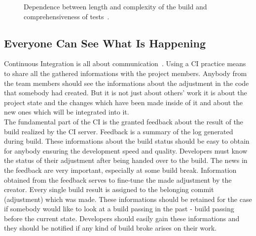 \begin{figure}[H]
    \centering
    \caption{Dependence between length and complexity of the build and comprehensiveness of tests~\cite{deployment_automation}.}
    \label{fig:grap_dependence}
\end{figure}

\subsection{Everyone Can See What Is Happening}

Continuous Integration is all about communication~\cite{MartinFowler}. Using a CI practice means to share all the gathered informations with the project members. Anybody from the team members should see the informations about the adjustment in the code that somebody had created. But it is not just about others' work it is about the project state and the changes which have been made inside of it and about the new ones which will be integrated into it.\\

The fundamental part of the CI is the granted feedback about the result of the build realized by the CI server. Feedback is a summary of the log generated during build. These informations about the build status should be easy to obtain for anybody ensuring the development speed and quality. Developers must know the status of their adjustment after being handed over to the build. The news in the feedback are very important, especially at some build break. Information obtained from the feedback serves to fine-tune the made adjustment by the creator. Every single build result is assigned to the belonging commit (adjustment) which was made. These informations should be retained for the case if somebody would like to look at a build passing in the past - build passing before the current state. Developers should easily gain these informations and they should be notified if any kind of build broke arises on their work.

